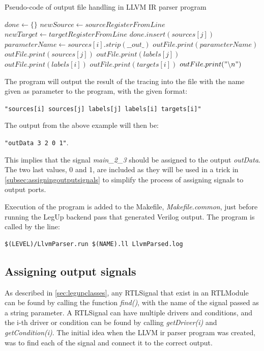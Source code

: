 \begin{algorithm}
  \caption{Pseudo-code of output file handling in LLVM IR parser program
  \label{alg:llvmparserpart2}}
  \begin{algorithmic}[1]
    \State $done \leftarrow \{\}$
            \State $newSource \leftarrow sourceRegisterFromLine$
            \State $newTarget \leftarrow targetRegisterFromLine$
            \State $done.insert(sources[j])$
              \State $parameterName \leftarrow sources[i].strip(\_\_out\_)$
              \State $outFile.print(parameterName)$
              \State $outFile.print(sources[j])$
              \State $outFile.print(labels[j])$
              \State $outFile.print(labels[i])$
              \State $outFile.print(targets[i])$
              \State $outFile.print("\backslash n")$ 
            \EndIf
          \EndIf
        \EndFor
      \EndFor
    \EndIf
  \end{algorithmic}
\end{algorithm}

The program will output the result of the tracing into the file with the name given as parameter to the program, with the given format:

\verb!"sources[i] sources[j] labels[j] labels[i] targets[i]"!

The output from the above example will then be:

\verb!"outData 3 2 0 1"!.

This implies that the signal \textit{main\_2\_3} should be assigned to the output \textit{outData}. The two last values, 0 and 1, are included as they will be used in a trick in \cref{subsec:assigningoutputsignals} to simplify the process of assigning signals to output ports.

Execution of the program is added to the Makefile, \textit{Makefile.common}, just before running the LegUp backend pass that generated Verilog output. The program is called by the line:
\begin{verbatim}
$(LEVEL)/LlvmParser.run $(NAME).ll LlvmParsed.log
\end{verbatim}

\subsection{\label{subsec:assigningoutputsignals}Assigning output signals}
As described in \cref{sec:legupclasses}, any RTLSignal that exist in an RTLModule can be found by calling the function \textit{find()}, with the name of the signal passed as a string parameter. A RTLSignal can have multiple drivers and conditions, and the i-th driver or condition can be found by calling \textit{getDriver(i)} and \textit{getCondition(i)}. The initial idea when the LLVM \gls{ir} parser program was created, was to find each of the signal and connect it to the correct output.

